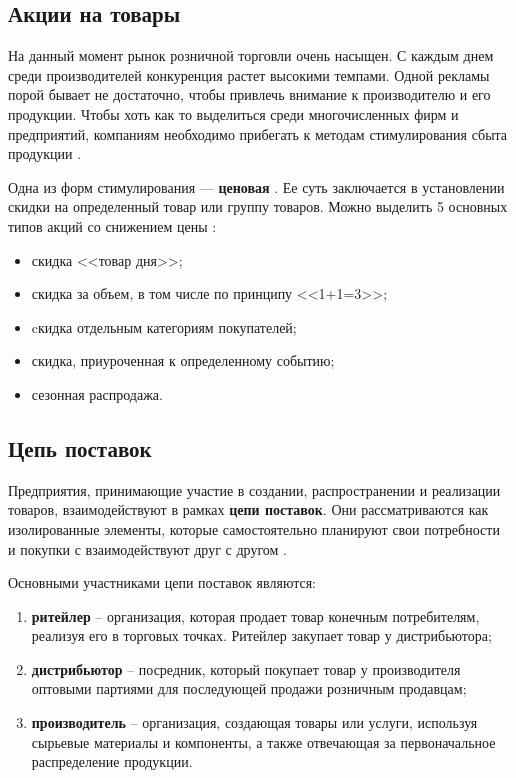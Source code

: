 \subsection*{Акции на товары}

На данный момент рынок розничной торговли очень насыщен. 
С каждым днем среди производителей конкуренция растет высокими темпами. 
Одной рекламы порой бывает не достаточно, чтобы привлечь внимание к производителю и его продукции. 
Чтобы хоть как то выделиться среди многочисленных фирм и предприятий, компаниям необходимо прибегать к методам стимулирования сбыта продукции \cite{info_stock}.

Одна из форм стимулирования --- \textbf{ценовая} \cite{info_stock}. 
Ее суть заключается в установлении скидки на определенный товар или группу товаров.
Можно выделить 5 основных типов акций со снижением  цены \cite{info_promotion1, info_promotion2}:

\begin{itemize}[label*=--]
	\item скидка <<товар дня>>;
	\item скидка за объем, в том числе по принципу <<1+1=3>>;
	\item cкидка отдельным категориям покупателей;
	\item скидка, приуроченная к определенному событию;
	\item сезонная распродажа.
\end{itemize}

\subsection*{Цепь поставок}

Предприятия, принимающие участие в создании, распространении и реализации товаров, взаимодействуют в рамках \textbf{цепи поставок}. Они рассматриваются как изолированные элементы, которые самостоятельно планируют свои потребности и покупки с взаимодействуют друг с другом \cite{info_supply_chain}.

Основными участниками цепи поставок являются:

\begin{enumerate}
	\item \textbf{ритейлер} -- организация, которая продает товар конечным потребителям, реализуя его в торговых точках. Ритейлер закупает товар у дистрибьютора;
	\item \textbf{дистрибьютор} -- посредник, который покупает товар у производителя оптовыми партиями для последующей продажи розничным продавцам;
	\item \textbf{производитель} -- организация, создающая товары или услуги, используя сырьевые материалы и компоненты, а также отвечающая за первоначальное распределение продукции.
\end{enumerate}

